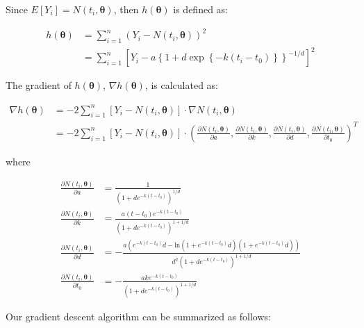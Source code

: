 \documentclass[
]{article}
\begin{document}
Since \(E[Y_i] = N(t_i, \boldsymbol{\theta})\), then
\(h(\boldsymbol{\theta})\) is defined as:

\[
\begin{aligned}
h(\boldsymbol{\theta}) 
&= \sum_{i=1}^n(Y_i -  N(t_i, \boldsymbol{\theta}))^2 \\
&= \sum_{i=1}^n \left[Y_i - a \left\{1 + d\exp\left\{-k(t_i-t_0)\right\}\right\}^{-1/d}\right]^2
\end{aligned}
\]

The gradient of \(h(\boldsymbol{\theta})\),
\(\nabla h(\boldsymbol{\theta})\), is calculated as:

\[
\begin{aligned}
\nabla h(\boldsymbol{\theta})
 &= -2 \sum_{i=1}^n [Y_i - N(t_i,\boldsymbol{\theta})]\cdot \nabla N(t_i,\boldsymbol{\theta}) \\
 &= -2 \sum_{i=1}^n [Y_i - N(t_i,\boldsymbol{\theta})]\cdot 
 \left(
 \frac{\partial N(t_i,\boldsymbol{\theta})}{\partial a}, 
 \frac{\partial N(t_i,\boldsymbol{\theta})}{\partial k}, 
 \frac{\partial N(t_i,\boldsymbol{\theta})}{\partial d}, 
 \frac{\partial N(t_i,\boldsymbol{\theta})}{\partial t_0}
 \right)^T 
\end{aligned}
\]

where

\[
\begin{aligned}
\frac{\partial N(t_i,\boldsymbol{\theta})}{\partial a} &= \frac{1}{(1 + d e^{-k(t-t_0)})^{1/d}}\\
\frac{\partial N(t_i,\boldsymbol{\theta})}{\partial k} &= \frac{a (t-t_0) e^{-k(t-t_0)}}{(1 + d e^{-k(t-t_0)})^{1+1/d}} \\
\frac{\partial N(t_i,\boldsymbol{\theta})}{\partial d} &= -\frac{a(e^{-k(t-t_0)}d - \text{ln}(1+e^{-k(t-t_0)}d)(1 + e^{-k(t-t_0)}d))}{d^2(1 + d e^{-k(t-t_0)})^{1+1/d}} \\
\frac{\partial N(t_i,\boldsymbol{\theta})}{\partial t_0} &= -\frac{ak e^{-k(t-t_0)}}{(1 + d e^{-k(t-t_0)})^{1+1/d}}
\end{aligned}
\]

Our gradient descent algorithm can be summarized as follows:
\end{document}
